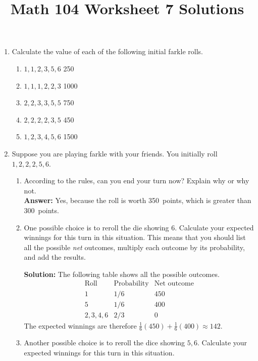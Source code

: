 \documentclass[12pt]{article}
\author{}
\title{Math 104 Worksheet 7 Solutions}
\begin{document}
\maketitle
\thispagestyle{empty}
\begin{enumerate}
\item Calculate the value of each of the following
initial farkle rolls.
\begin{enumerate}
\item $1,1,2,3,5,6$
 250
\item $1,1,1,2,2,3$
 1000
\item $2,2,3,3,5,5$
 750
\item $2,2,2,2,3,5$
 450
\item $1,2,3,4,5,6$
 1500
\end{enumerate}

\item Suppose you are playing farkle with your
friends. You initially roll $1,2,2,2,5,6$.
\begin{enumerate}
\item\label{Stay}
According to the rules, can you end your turn now?
Explain why or why not.\\
{\bf Answer:} Yes, because the roll is worth 350~points,
which is greater than 300~points.
\item One possible choice is to reroll the die showing 6.
Calculate your expected winnings for this turn in
this situation.
This means that you should list all the possible {\em net}
outcomes, multiply each outcome by its probability,
and add the results.

{\bf Solution:} The following table shows
all the possible outcomes.
\[\begin{array}{ccc}
\text{Roll}&\text{Probability}&\text{Net outcome}\\\hline
1&1/6&450\\
5&1/6&400\\
2,3,4,6&2/3&0
\end{array}\]
The expected winnings are therefore
$\frac{1}{6}\left(450\right)+\frac{1}{6}\left(400\right)
\approx 142$.

\item\label{RollTwo} Another possible choice is to reroll
the dice showing $5,6$.
Calculate your expected winnings for this turn in
this situation.


\end{enumerate}
\end{enumerate}
\end{document}
